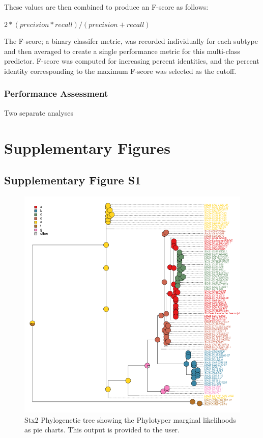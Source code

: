 \documentclass[11pt,letterpaper]{article}
\begin{document}
These values are then combined to produce an F-score as follows:

$2 * ( precision * recall ) / ( precision + recall )$

The F-score; a binary classifer metric, was recorded individually for each subtype and then averaged to create a single performance metric for this multi-class predictor.  F-score was computed for increasing percent identities, and the percent identity corresponding to the maximum F-score was selected as the cutoff.

\subsubsection{Performance Assessment}

Two separate analyses 

\section{Supplementary Figures}

\subsection{Supplementary Figure S1}

\begin{figure}[h!]
\centering
\includegraphics[scale=0.5]{sfig01.png}
\caption{Stx2 Phylogenetic tree showing the Phylotyper marginal likelihoods as pie charts. This output is provided to the user.}
\end{figure}
\end{document}
